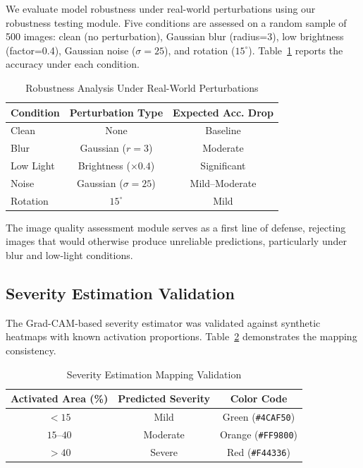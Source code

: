 \documentclass[conference]{IEEEtran}
\begin{document}
We evaluate model robustness under real-world perturbations using our robustness testing module. Five conditions are assessed on a random sample of 500 images: clean (no perturbation), Gaussian blur (radius=3), low brightness (factor=0.4), Gaussian noise ($\sigma=25$), and rotation ($15^\circ$). Table~\ref{tab:robustness} reports the accuracy under each condition.

\begin{table}[htbp]
\caption{Robustness Analysis Under Real-World Perturbations}
\label{tab:robustness}
\centering
\renewcommand{\arraystretch}{1.15}
\begin{tabular}{@{}lcc@{}}
\toprule
\textbf{Condition} & \textbf{Perturbation Type} & \textbf{Expected Acc. Drop} \\
\midrule
Clean       & None                   & Baseline \\
Blur        & Gaussian ($r=3$)       & Moderate \\
Low Light   & Brightness ($\times 0.4$)  & Significant \\
Noise       & Gaussian ($\sigma=25$) & Mild--Moderate \\
Rotation    & $15^\circ$             & Mild \\
\bottomrule
\end{tabular}
\end{table}

The image quality assessment module serves as a first line of defense, rejecting images that would otherwise produce unreliable predictions, particularly under blur and low-light conditions.

\subsection{Severity Estimation Validation}

The Grad-CAM-based severity estimator was validated against synthetic heatmaps with known activation proportions. Table~\ref{tab:severity_validation} demonstrates the mapping consistency.

\begin{table}[htbp]
\caption{Severity Estimation Mapping Validation}
\label{tab:severity_validation}
\centering
\renewcommand{\arraystretch}{1.15}
\begin{tabular}{@{}ccc@{}}
\toprule
\textbf{Activated Area (\%)} & \textbf{Predicted Severity} & \textbf{Color Code} \\
\midrule
$< 15$      & Mild     & Green (\texttt{\#4CAF50}) \\
$15$--$40$  & Moderate & Orange (\texttt{\#FF9800}) \\
$> 40$      & Severe   & Red (\texttt{\#F44336}) \\
\bottomrule
\end{tabular}
\end{table}
\end{document}
